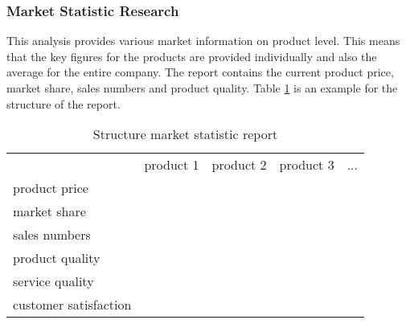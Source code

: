\subsubsection{Market Statistic Research}
This analysis provides various market information on product level. This means that the key figures for the products are provided individually and also the average for the entire company. The report contains the current product price, market share, sales numbers and product quality. Table \ref{MR_market_statistic} is an example for the structure of the report. \\

\begin{table}[ht]
\centering
\begin{tabular}{|l|r|r|r|r|}
\hline
                        & product 1   & product 2  & product 3 & ...       \\
product price           &             &            &           &           \\
market share            &             &            &           &           \\
sales numbers           &             &            &           &           \\
product quality         &             &            &           &           \\
service quality         &             &            &           &           \\
customer satisfaction   &             &            &           &           \\
\hline
\end{tabular}
\caption{Structure market statistic report}
\label{MR_market_statistic}
\end{table}